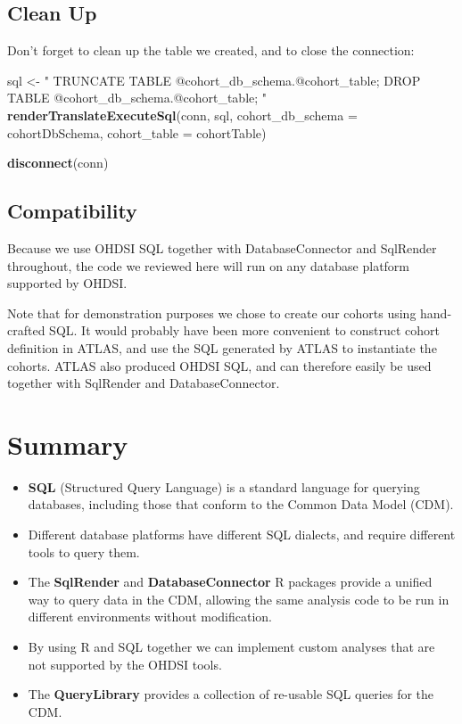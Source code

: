 \documentclass[11pt]{book}
\newenvironment{Shaded}{\begin{snugshade}}{\end{snugshade}}
\newcommand{\KeywordTok}[1]{\textcolor[rgb]{0.13,0.29,0.53}{\textbf{#1}}}
\newcommand{\DataTypeTok}[1]{\textcolor[rgb]{0.13,0.29,0.53}{#1}}
\newcommand{\StringTok}[1]{\textcolor[rgb]{0.31,0.60,0.02}{#1}}
\newcommand{\NormalTok}[1]{#1}
\theoremstyle{definition}
\theoremstyle{definition}
\theoremstyle{definition}
\theoremstyle{remark}
\let\BeginKnitrBlock\begin \let\EndKnitrBlock\end
\begin{document}
\subsection{Clean Up}\label{clean-up}

Don't forget to clean up the table we created, and to close the
connection:

\begin{Shaded}
\begin{Highlighting}[]
\NormalTok{sql <-}\StringTok{ "}
\StringTok{TRUNCATE TABLE @cohort_db_schema.@cohort_table;}
\StringTok{DROP TABLE @cohort_db_schema.@cohort_table;}
\StringTok{"}
\KeywordTok{renderTranslateExecuteSql}\NormalTok{(conn, sql,}
                          \DataTypeTok{cohort_db_schema =}\NormalTok{ cohortDbSchema,}
                          \DataTypeTok{cohort_table =}\NormalTok{ cohortTable)}

\KeywordTok{disconnect}\NormalTok{(conn)}
\end{Highlighting}
\end{Shaded}

\subsection{Compatibility}\label{compatibility}

Because we use OHDSI SQL together with DatabaseConnector and SqlRender
throughout, the code we reviewed here will run on any database platform
supported by OHDSI.

Note that for demonstration purposes we chose to create our cohorts
using hand-crafted SQL. It would probably have been more convenient to
construct cohort definition in ATLAS, and use the SQL generated by ATLAS
to instantiate the cohorts. ATLAS also produced OHDSI SQL, and can
therefore easily be used together with SqlRender and DatabaseConnector.

\section{Summary}\label{summary-4}

\BeginKnitrBlock{rmdsummary}
\begin{itemize}
\item
  \textbf{SQL} (Structured Query Language) is a standard language for
  querying databases, including those that conform to the Common Data
  Model (CDM).
\item
  Different database platforms have different SQL dialects, and require
  different tools to query them.
\item
  The \textbf{SqlRender} and \textbf{DatabaseConnector} R packages
  provide a unified way to query data in the CDM, allowing the same
  analysis code to be run in different environments without
  modification.
\item
  By using R and SQL together we can implement custom analyses that are
  not supported by the OHDSI tools.
\item
  The \textbf{QueryLibrary} provides a collection of re-usable SQL
  queries for the CDM.
\end{itemize}
\EndKnitrBlock{rmdsummary}
\end{document}
